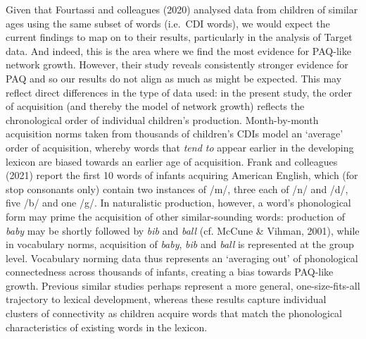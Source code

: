 \documentclass[
  man,mask,floatsintext]{apa6}
\begin{document}
Given that Fourtassi and colleagues (2020) analysed data from children of similar ages using the same subset of words (i.e.~CDI words), we would expect the current findings to map on to their results, particularly in the analysis of Target data. And indeed, this is the area where we find the most evidence for PAQ-like network growth. However, their study reveals consistently stronger evidence for PAQ and so our results do not align as much as might be expected. This may reflect direct differences in the type of data used: in the present study, the order of acquisition (and thereby the model of network growth) reflects the chronological order of individual children's production. Month-by-month acquisition norms taken from thousands of children's CDIs model an `average' order of acquisition, whereby words that \emph{tend to} appear earlier in the developing lexicon are biased towards an earlier age of acquisition. Frank and colleagues (2021) report the first 10 words of infants acquiring American English, which (for stop consonants only) contain two instances of /m/, three each of /n/ and /d/, five /b/ and one /g/. In naturalistic production, however, a word's phonological form may prime the acquisition of other similar-sounding words: production of \emph{baby} may be shortly followed by \emph{bib} and \emph{ball} (cf. McCune \& Vihman, 2001), while in vocabulary norms, acquisition of \emph{baby}, \emph{bib} and \emph{ball} is represented at the group level. Vocabulary norming data thus represents an `averaging out' of phonological connectedness across thousands of infants, creating a bias towards PAQ-like growth. Previous similar studies perhaps represent a more general, one-size-fits-all trajectory to lexical development, whereas these results capture individual clusters of connectivity as children acquire words that match the phonological characteristics of existing words in the lexicon.
\end{document}
